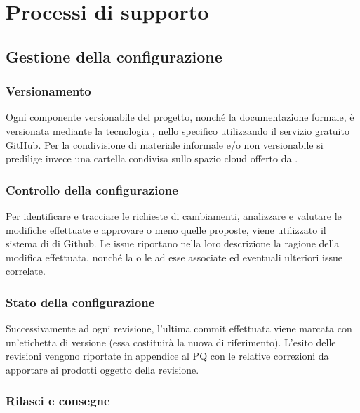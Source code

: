 \documentclass[../NormediProgetto.tex]{subfiles}
\begin{document}

\chapter{Processi di supporto}


\section{Gestione della configurazione}

\subsection{Versionamento} 
Ogni componente versionabile del progetto, nonché la documentazione formale, è versionata mediante la tecnologia , nello specifico utilizzando il servizio gratuito GitHub.
Per la condivisione di materiale informale e/o non versionabile si predilige invece una cartella condivisa sullo spazio cloud offerto da .

\subsection{Controllo della configurazione}

Per identificare e tracciare le richieste di cambiamenti, analizzare e valutare le modifiche effettuate e approvare o meno quelle proposte, viene utilizzato il sistema di  di Github. Le issue riportano nella loro descrizione la ragione della modifica effettuata, nonché la o le  ad esse associate ed eventuali ulteriori issue correlate. 

\subsection{Stato della configurazione}

Successivamente ad ogni revisione, l'ultima commit effettuata viene marcata con un'etichetta di versione (essa costituirà la nuova  di riferimento). L'esito delle revisioni vengono riportate in appendice al PQ con le relative correzioni da apportare ai prodotti oggetto della revisione.

\subsection{Rilasci e consegne}
\end{document}
